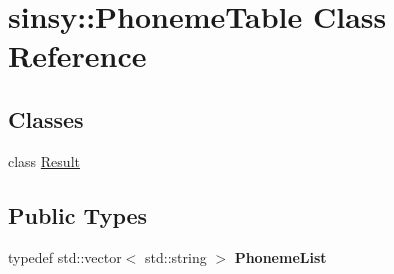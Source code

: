 \hypertarget{classsinsy_1_1PhonemeTable}{\section{sinsy\-:\-:\-Phoneme\-Table \-Class \-Reference}
\label{classsinsy_1_1PhonemeTable}
}
\subsection*{\-Classes}
\begin{DoxyCompactItemize}
\item 
class \hyperlink{classsinsy_1_1PhonemeTable_1_1Result}{\-Result}
\end{DoxyCompactItemize}
\subsection*{\-Public \-Types}
\begin{DoxyCompactItemize}
\item 
\hypertarget{classsinsy_1_1PhonemeTable_a925af78f8e8fa5c3c061533aff92fa00}{typedef std\-::vector$<$ std\-::string $>$ {\bfseries \-Phoneme\-List}}\label{classsinsy_1_1PhonemeTable_a925af78f8e8fa5c3c061533aff92fa00}

\end{DoxyCompactItemize}
